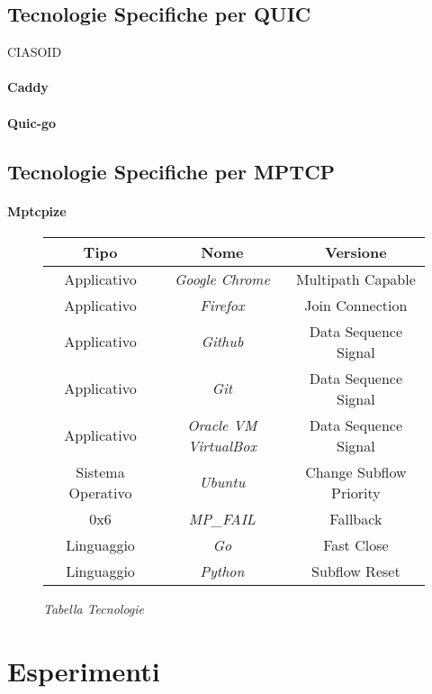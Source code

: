 \subsection{Tecnologie Specifiche per QUIC}

CIASOID
\paragraph{Caddy}
\paragraph{Quic-go}
\subsection{Tecnologie Specifiche per MPTCP}
\paragraph{Mptcpize}

\begin{figure}[!h]
    \centering
    \begin{tabular}{|c|c|c|}
        \hline
        \textbf{Tipo} & \textbf{Nome} & \textbf{Versione} \\
        \hline
        Applicativo & \emph{Google Chrome} & Multipath Capable \\
        \hline
        Applicativo & \emph{Firefox} & Join Connection \\
        \hline
        Applicativo & \emph{Github} & Data Sequence Signal \\
        \hline
        Applicativo & \emph{Git} & Data Sequence Signal \\
        \hline
        Applicativo & \emph{Oracle VM VirtualBox} & Data Sequence Signal \\
        \hline
        Sistema Operativo & \emph{Ubuntu} & Change Subflow Priority \\
        \hline
        0x6 & \emph{MP\_FAIL} & Fallback \\
        \hline
        Linguaggio & \emph{Go} & Fast Close \\
        \hline
        Linguaggio & \emph{Python} & Subflow Reset \\
        \hline
    \end{tabular}
    \caption{\emph{Tabella Tecnologie}}
    \label{table-tecnologie}
\end{figure}

\section{Esperimenti}

